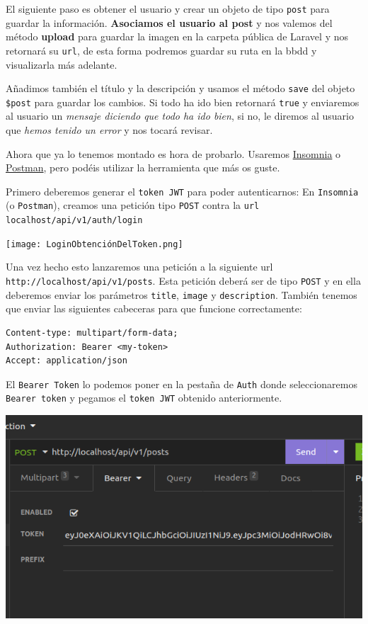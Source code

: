 \documentclass[11pt]{article}
\begin{document}
El siguiente paso es obtener el usuario y crear un objeto de tipo
\texttt{post} para guardar la información. \textbf{Asociamos el usuario al post} y
nos valemos del método \textbf{upload} para guardar la imagen en la carpeta
pública de Laravel y nos retornará su \texttt{url}, de esta forma podremos
guardar su ruta en la bbdd y visualizarla más adelante.

Añadimos también el título y la descripción y usamos el método \texttt{save}
del objeto \texttt{\$post} para guardar los cambios. Si todo ha ido bien
retornará \texttt{true} y enviaremos al usuario un \emph{mensaje diciendo que todo ha
ido bien}, si no, le diremos al usuario que \emph{hemos tenido un error} y nos
tocará revisar.

Ahora que ya lo tenemos montado es hora de probarlo. Usaremos \href{https://insomnia.rest/}{Insomnia}
o \href{https://www.postman.com/product/rest-client/}{Postman}, pero podéis utilizar la herramienta que más os guste.

Primero deberemos generar el \texttt{token JWT} para poder autenticarnos: En
\texttt{Insomnia} (o \texttt{Postman}), creamos una petición tipo \texttt{POST} contra la \texttt{url}
\texttt{localhost/api/v1/auth/login}
\begin{center}
\texttt{[image: LoginObtenciónDelToken.png]}
\end{center}

Una vez hecho esto lanzaremos una petición a la siguiente
url \texttt{http://localhost/api/v1/posts}. Esta petición deberá ser de
tipo \texttt{POST} y en ella deberemos enviar los parámetros \texttt{title}, \texttt{image} y
\texttt{description}. También tenemos que enviar las siguientes cabeceras para
que funcione correctamente:

\begin{verbatim}
Content-type: multipart/form-data;
Authorization: Bearer <my-token>
Accept: application/json
\end{verbatim}

El \texttt{Bearer Token} lo podemos poner en la pestaña de \texttt{Auth} donde
seleccionaremos \texttt{Bearer token} y pegamos el \texttt{token JWT} obtenido
anteriormente.

\begin{center}
\includegraphics[width=.9\linewidth]{BearerToken.png}
\end{center}
\end{document}
